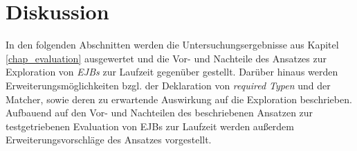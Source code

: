 \chapter{Diskussion}
In den folgenden Abschnitten werden die Untersuchungsergebnisse aus Kapitel \ref{chap_evaluation} ausgewertet und die Vor- und Nachteile des Ansatzes zur Exploration von \emph{EJBs} zur Laufzeit gegenüber gestellt. Darüber hinaus werden Erweiterungsmöglichkeiten bzgl. der Deklaration von \emph{required Typen} und der Matcher, sowie deren zu erwartende Auswirkung auf die Exploration beschrieben. Aufbauend auf den Vor- und Nachteilen des beschriebenen Ansatzen zur testgetriebenen Evaluation von EJBs zur Laufzeit werden außerdem Erweiterungsvorschläge des Ansatzes vorgestellt.


 
